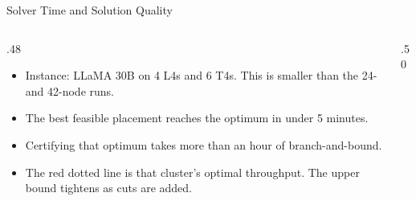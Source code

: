 \begin{frame}[t,label=mm_hx_milpabl_02]{Solver Time and Solution Quality}

  \par
  \vspace{.02cm}
  \begin{columns}[c,onlytextwidth]
    \begin{column}{.48\textwidth}
      {\footnotesize\begin{itemize}\setlength{\itemsep}{.07cm}
        \item Instance: LLaMA 30B on 4 L4s and 6 T4s. This is smaller than the 24- and 42-node runs.
        \item The best feasible placement reaches the optimum in under 5 minutes.
        \item Certifying that optimum takes more than an hour of branch-and-bound.
        \item The red dotted line is that cluster's optimal throughput. The upper bound tightens as cuts are added.
      \end{itemize}}
      \vspace{.12cm}
    \end{column}
    \begin{column}{.50\textwidth}
    \end{column}
  \end{columns}
\end{frame}

\begin{frame}[plain,label=mm_hx_eval_01]
\end{frame}

\begin{frame}[plain,label=mm_hx_work_01]
\end{frame}

\begin{frame}[plain,label=mm_hx_single_01]
\end{frame}

\begin{frame}[plain,label=mm_hx_geo_01]
\end{frame}

